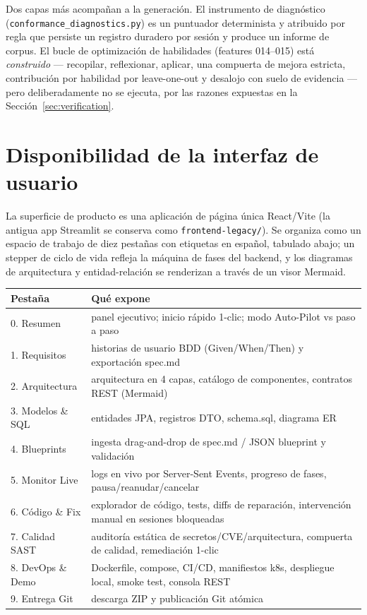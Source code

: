 \documentclass[11pt,a4paper]{article}
\begin{document}
Dos capas más acompañan a la generación. El instrumento de diagnóstico
(\texttt{conformance\_diagnostics.py}) es un puntuador determinista y atribuido por
regla que persiste un registro duradero por sesión y produce un informe de corpus. El
bucle de optimización de habilidades (features 014--015) está \emph{construido} ---
recopilar, reflexionar, aplicar, una compuerta de mejora estricta, contribución por
habilidad por leave-one-out y desalojo con suelo de evidencia --- pero deliberadamente
no se ejecuta, por las razones expuestas en la Sección~\ref{sec:verification}.

\section{Disponibilidad de la interfaz de usuario}

La superficie de producto es una aplicación de página única React/Vite (la antigua app
Streamlit se conserva como \texttt{frontend-legacy/}). Se organiza como un espacio de
trabajo de diez pestañas con etiquetas en español, tabulado abajo; un stepper de ciclo
de vida refleja la máquina de fases del backend, y los diagramas de arquitectura y
entidad-relación se renderizan a través de un visor Mermaid.

\begin{center}
\begin{longtable}{@{}p{}p{}@{}}
\toprule
\textbf{Pestaña} & \textbf{Qué expone} \\
\midrule
0. Resumen & panel ejecutivo; inicio rápido 1-clic; modo Auto-Pilot vs paso a paso \\
1. Requisitos & historias de usuario BDD (Given/When/Then) y exportación spec.md \\
2. Arquitectura & arquitectura en 4 capas, catálogo de componentes, contratos REST (Mermaid) \\
3. Modelos \& SQL & entidades JPA, registros DTO, schema.sql, diagrama ER \\
4. Blueprints & ingesta drag-and-drop de spec.md / JSON blueprint y validación \\
5. Monitor Live & logs en vivo por Server-Sent Events, progreso de fases, pausa/reanudar/cancelar \\
6. Código \& Fix & explorador de código, tests, diffs de reparación, intervención manual en sesiones bloqueadas \\
7. Calidad SAST & auditoría estática de secretos/CVE/arquitectura, compuerta de calidad, remediación 1-clic \\
8. DevOps \& Demo & Dockerfile, compose, CI/CD, manifiestos k8s, despliegue local, smoke test, consola REST \\
9. Entrega Git & descarga ZIP y publicación Git atómica \\
\bottomrule
\end{longtable}
\end{center}
\end{document}
